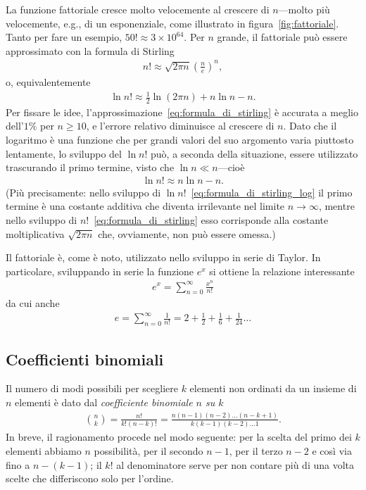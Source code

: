 La funzione fattoriale cresce molto velocemente al crescere di $n$---molto
più velocemente, e.g., di un esponenziale, come illustrato in
figura~\ref{fig:fattoriale}.
Tanto per fare un esempio, $50! \approx 3 \times 10^{64}$.
Per $n$ grande, il fattoriale può essere approssimato con la formula di
Stirling
\begin{align}\label{eq:formula_di_stirling}
  n! \approx \sqrt{2\pi n}\left( \frac{n}{e} \right)^n,
\end{align}
o, equivalentemente
\begin{align}\label{eq:formula_di_stirling_log}
  \ln n! \approx \frac{1}{2}\ln(2\pi n) + n\ln n - n.
\end{align}
Per fissare le idee, l'approssimazione~\eqref{eq:formula_di_stirling} è
accurata a meglio dell'$1\%$ per $n \geq 10$, e l'errore relativo diminuisce
al crescere di $n$.
Dato che il logaritmo è una funzione che per grandi valori del suo argomento
varia piuttosto lentamente, lo sviluppo del $\ln n!$ può, a seconda della
situazione, essere utilizzato trascurando il primo termine, visto che
$\ln n \ll n$---cioè
\begin{align}\label{eq:formula_di_stirling_log_troncata}
  \ln n! \approx n\ln n - n.
\end{align}
(Più precisamente: nello sviluppo di
$\ln n!$~\eqref{eq:formula_di_stirling_log} il primo termine è una
costante additiva che diventa irrilevante nel limite $n \rightarrow \infty$,
mentre nello sviluppo di $n!$~\eqref{eq:formula_di_stirling} esso corrisponde
alla costante moltiplicativa $\sqrt{2\pi n}$ che, ovviamente, non può
essere omessa.)

Il fattoriale è, come è noto, utilizzato nello sviluppo in serie di Taylor.
In particolare, sviluppando in serie la funzione $e^x$ si ottiene la
relazione interessante
\begin{align}
  e^x = \sum_{n=0}^{\infty} \frac{x^n}{n!}
\end{align}
da cui anche
\begin{align}
  e = \sum_{n=0}^{\infty} \frac{1}{n!} = 2 + \frac{1}{2} + \frac{1}{6} +
  \frac{1}{24} \ldots
\end{align}


\subsection{Coefficienti binomiali}

Il numero di modi possibili per scegliere $k$ elementi non ordinati da un
insieme di $n$ elementi è dato dal \emph{coefficiente binomiale $n$ su $k$}
\begin{align}
  \binom{n}{k} = \frac{n!}{k!(n - k)!} =
  \frac{n(n - 1)(n - 2)\ldots (n - k + 1)}{k(k - 1)(k - 2)\ldots 1}.
\end{align}
In breve, il ragionamento procede nel modo seguente: per la scelta del primo
dei $k$ elementi abbiamo $n$ possibilità, per il secondo $n - 1$, per il
terzo $n - 2$ e così via fino a $n - (k - 1)$; il $k!$ al denominatore
serve per non contare più di una volta scelte che differiscono solo per
l'ordine.

